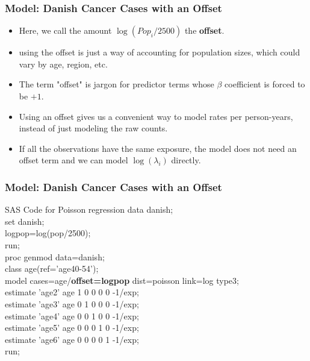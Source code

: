 \documentclass[10pt,xcolor={svgnames},t]{beamer}
\begin{document}
\begin{frame}
	\frametitle{Model: Danish Cancer Cases with an Offset}
	
	\begin{itemize}
		
		\item Here, we call the amount $\log(Pop_i/2500)$ the \textbf{offset}.
				\bigskip
		\item using the offset is just a way of accounting for population sizes, which could vary by age, region, etc.
				\bigskip
		\item The term "offset" is jargon for predictor terms whose $\beta$ coefficient is forced to be $+1$.
				\bigskip
		\item Using an offset gives us a convenient way to model rates per person-years, instead of just modeling the raw counts.
				\bigskip
		\item If all the observations have the same exposure, the model does not need an offset term and we can model $\log(\lambda_i)$ directly.
	\end{itemize}
	
	
\end{frame}
%
%
\begin{frame}
	\frametitle{Model: Danish Cancer Cases with an Offset}
	
	\begin{block}{SAS Code for Poisson regression}
		data danish;\\
		set danish;\\
		logpop=log(pop/2500);\\
		run;\\
		
		proc genmod data=danish; \\
		class age(ref='age40-54'); \\
		model cases=age/\textbf{offset=logpop} dist=poisson link=log type3; \\
		estimate 'age2' age 1 0 0 0 0 -1/exp;\\
		estimate 'age3' age 0 1 0 0 0 -1/exp;\\
		estimate 'age4' age 0 0 1 0 0 -1/exp;\\
		estimate 'age5' age 0 0 0 1 0 -1/exp;\\
		estimate 'age6' age 0 0 0 0 1 -1/exp;\\
		run;
	\end{block}
	
	
\end{frame}
\end{document}
